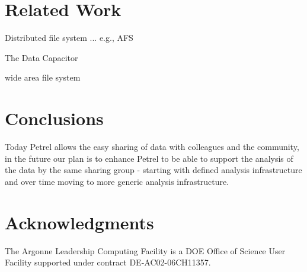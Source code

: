 \documentclass[sigconf]{acmart}
\begin{document}
\section{Related Work}

Distributed file system ... e.g., AFS 

The Data Capacitor~\cite{simms2007empowering}

wide area file system 





\section{Conclusions}
Today Petrel allows the easy sharing of data with colleagues and the community, in the future our plan is to enhance Petrel to be able to support the analysis of the data by the same sharing group - starting with defined analysis infrastructure and over time moving to more generic analysis infrastructure.

\section*{Acknowledgments}
The Argonne Leadership Computing Facility is a DOE Office of Science User Facility supported under contract DE-AC02-06CH11357.



 
\end{document}
